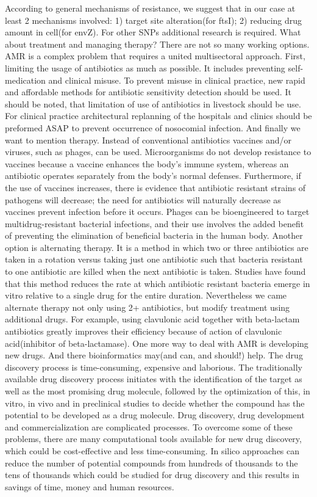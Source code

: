 \documentclass{article}
\begin{document}
According to general mechanisms of resistance, we suggest that in our case at least 2 mechanisms involved:
1) target site alteration(for ftsI);
2) reducing drug amount in cell(for envZ).
For other SNPs additional research is required.
What about treatment and managing therapy? There are not so many working options. AMR is a complex problem that requires a united multisectoral approach.
First, limiting the usage of antibiotics as much as possible. It includes preventing self-medication and clinical misuse. To prevent misuse in clinical practice, new rapid and affordable methods for antibiotic sensitivity detection should be used. It should be noted, that limitation of use of antibiotics in livestock should be use. For clinical practice architectural replanning of the hospitals and clinics should be preformed ASAP to prevent occurrence of nosocomial infection.
And finally we want to mention therapy. Instead of conventional antibiotics vaccines and/or viruses, such as phages, can be used. Microorganisms do not develop resistance to vaccines because a vaccine enhances the body's immune system, whereas an antibiotic operates separately from the body's normal defenses. Furthermore, if the use of vaccines increases, there is evidence that antibiotic resistant strains of pathogens will decrease; the need for antibiotics will naturally decrease as vaccines prevent infection before it occurs. Phages can be bioengineered to target multidrug-resistant bacterial infections, and their use involves the added benefit of preventing the elimination of beneficial bacteria in the human body.
Another option is alternating therapy. It is a method in which two or three antibiotics are taken in a rotation versus taking just one antibiotic such that bacteria resistant to one antibiotic are killed when the next antibiotic is taken. Studies have found that this method reduces the rate at which antibiotic resistant bacteria emerge in vitro relative to a single drug for the entire duration. Nevertheless we came alternate therapy not only using 2+ antibiotics, but modify treatment using additional drugs. For example, using clavulonic acid together with beta-lactam antibiotics greatly improves their efficiency because of action of clavulonic acid(inhibitor of beta-lactamase).
One more way to deal with AMR is developing new drugs. And there bioinformatics may(and can, and should!) help. The drug discovery process is time-consuming, expensive and laborious. The traditionally available drug discovery process initiates with the identification of the target as well as the most promising drug molecule, followed by the optimization of this, in vitro, in vivo and in preclinical studies to decide whether the compound has the potential to be developed as a drug molecule. Drug discovery, drug development and commercialization are complicated processes. To overcome some of these problems, there are many computational tools available for new drug discovery, which could be cost-effective and less time-consuming. In silico approaches can reduce the number of potential compounds from hundreds of thousands to the tens of thousands which could be studied for drug discovery and this results in savings of time, money and human resources.
\end{document}

